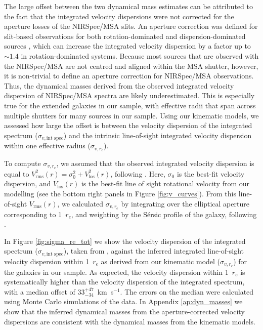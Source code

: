 \documentclass{aa}
\newcommand{\kms}{km~s$^{-1}$}
\begin{document}
The large offset between the two dynamical mass estimates can be attributed to the fact that the integrated velocity dispersions were not corrected for the aperture losses of the NIRSpec/MSA slits. An aperture correction was defined for slit-based observations for both rotation-dominated \citep{SPrice2014} and dispersion-dominated sources \citep{JvandeSande2013}, which can increase the integrated velocity dispersion by a factor up to $\sim1.4$ in rotation-dominated systems. Because most sources that are observed with the NIRSpec/MSA are not centred and aligned within the MSA shutter, however, it is non-trivial to define an aperture correction for NIRSpec/MSA observations. Thus, the dynamical masses derived from the observed integrated velocity dispersion of NIRSpec/MSA spectra are likely underestimated. This is especially true for the extended galaxies in our sample, with effective radii that span across multiple shutters for many sources in our sample.
Using our kinematic models, we assessed how large the offset is between the velocity dispersion of the integrated spectrum ($\sigma_{v,\text{int spec}}$) and the intrinsic line-of-sight integrated velocity dispersion within one effective radius ($\sigma_{v,r_e}$).

To compute $\sigma_{v,r_e}$, we assumed that the observed integrated velocity dispersion is equal to $V^2_{\text{rms}}(r) = \sigma_0^2 + V_{\text{los}}^2(r)$, following \citet{MCappellari2008}. Here, $\sigma_0$ is the best-fit velocity dispersion, and $V_{\text{los}}(r)$ is the best-fit line of sight rotational velocity from our modelling (see the bottom right panels in Figure \ref{fig:v_curves}). From this line-of-sight $V_{\text{rms}}(r)$, we calculated $\sigma_{v,r_e}$ by integrating over the elliptical aperture corresponding to 1~$r_e$, and weighting by the S\'ersic profile of the galaxy, following \citet{JvandeSande2013}.

In Figure \ref{fig:sigma_re_tot} we show the velocity dispersion of the integrated spectrum ($\sigma_{v,\text{int spec}}$), taken from \citet{ABeverage2024b}, against the inferred integrated line-of-sight velocity dispersion within 1~$r_e$ as derived from our kinematic model ($\sigma_{v,r_e}$) for the galaxies in our sample. As expected, the velocity dispersion within 1~$r_e$ is systematically higher than the velocity dispersion of the integrated spectrum, with a median offset of $33_{-34}^{+47}$~\kms. The errors on the median were calculated using Monte Carlo simulations of the data. In Appendix \ref{ap:dyn_masses} we show that the inferred dynamical masses from the aperture-corrected velocity dispersions are consistent with the dynamical masses from the kinematic models.
\end{document}
